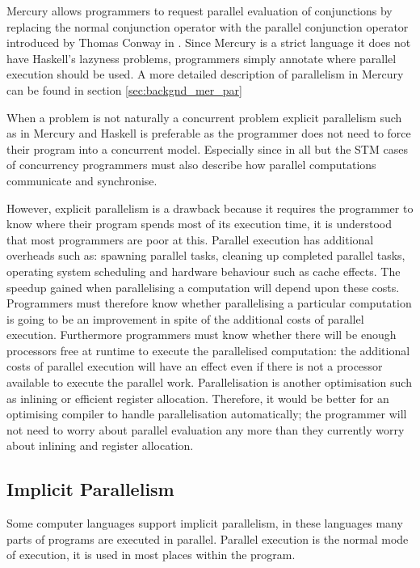 \label{ref:parallel_conjunction}
Mercury allows programmers to request parallel evaluation of
conjunctions by replacing the normal conjunction operator with the
parallel conjunction operator introduced by Thomas Conway in
\citep{conway:2002:par,wang_hons_thesis,wang_dep_par_conj}.
Since Mercury is a strict language it does not have Haskell's
lazyness problems,
programmers simply annotate where parallel execution
should be used.
A more detailed description of parallelism in Mercury can be found in
section \ref{sec:backgnd_mer_par}

When a problem is not naturally a concurrent problem 
explicit parallelism such as in Mercury and Haskell
is preferable as the programmer does not need to force their program
into a concurrent model.
Especially since in all but the STM cases of concurrency programmers
must also describe how parallel computations communicate and
synchronise.

However, explicit parallelism is a drawback because it requires the
programmer to know where their program spends most of its execution
time, it is understood that most programmers are poor at this.
Parallel execution has additional overheads such as:
spawning parallel tasks,
cleaning up completed parallel tasks,
operating system scheduling and
hardware behaviour such as cache effects.
The speedup gained when parallelising a computation will depend upon
these costs.
Programmers must therefore know whether parallelising a particular
computation is going to be an improvement in spite of the additional
costs of parallel execution.
Furthermore programmers must know whether there will be enough
processors free at runtime to execute the parallelised computation:
the additional costs of parallel execution will have an effect even
if there is not a processor available to execute the parallel work.
Parallelisation is another optimisation such as inlining or efficient
register allocation.
Therefore,
it would be better for an optimising compiler to handle parallelisation
automatically;
the programmer will not need to worry about parallel evaluation any more
than they currently worry about inlining and register allocation.

\subsection{Implicit Parallelism}
\label{sec:lit_implicit-parallelism}

Some computer languages support implicit parallelism,
in these languages many parts of programs are executed in parallel.
Parallel execution is the normal mode of execution,
it is used in most places within the program.

